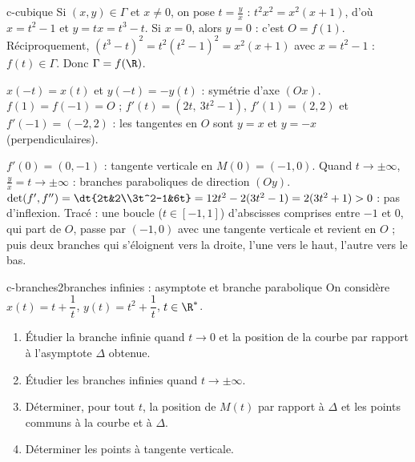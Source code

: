 \begin{corrige}{c-cubique}
 Si $(x,y)\in\Gamma$ et $x\neq0$, on pose $t=\frac yx$ : $t^2x^2=x^2(x+1)$, d'où $x=t^2-1$ et $y=tx=t^3-t$. Si $x=0$, alors $y=0$ : c'est $O=f(1)$. Réciproquement, $(t^3-t)^2=t^2(t^2-1)^2=x^2(x+1)$ avec $x=t^2-1$ : $f(t)\in\Gamma$. Donc $\Gamma=f(\R)$.

 $x(-t)=x(t)$ et $y(-t)=-y(t)$ : symétrie d'axe $(Ox)$. $f(1)=f(-1)=O$ ; $f'(t)=(2t,\ 3t^2-1)$, $f'(1)=(2,2)$ et $f'(-1)=(-2,2)$ : les tangentes en $O$ sont $y=x$ et $y=-x$ (perpendiculaires).

 $f'(0)=(0,-1)$ : tangente verticale en $M(0)=(-1,0)$. Quand $t\to\pm\infty$, $\frac yx=t\to\pm\infty$ : branches paraboliques de direction $(Oy)$. $\det(f',f'')=\dt{2t&2\\3t^2-1&6t}=12t^2-2(3t^2-1)=2(3t^2+1)>0$ : pas d'inflexion. Tracé : une boucle ($t\in[-1,1]$) d'abscisses comprises entre $-1$ et $0$, qui part de $O$, passe par $(-1,0)$ avec une tangente verticale et revient en $O$ ; puis deux branches qui s'éloignent vers la droite, l'une vers le haut, l'autre vers le bas.
\end{corrige}

\begin{exo}{c-branches}{2}{branches infinies : asymptote et branche parabolique}
On considère $x(t)=t+\dfrac1t$, $y(t)=t^2+\dfrac1t$, $t\in\R^*$.
\begin{enumerate}
\item Étudier la branche infinie quand $t\to0$ et la position de la courbe par rapport à l'asymptote $\Delta$ obtenue.
\item Étudier les branches infinies quand $t\to\pm\infty$.
\item Déterminer, pour tout $t$, la position de $M(t)$ par rapport à $\Delta$ et les points communs à la courbe et à $\Delta$.
\item Déterminer les points à tangente verticale.
\end{enumerate}
\end{exo}

